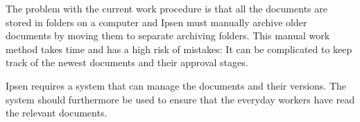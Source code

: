 The problem with the current work procedure is that all the documents are stored in folders on a computer and Ipsen must manually archive older documents by moving them to separate archiving folders.
This manual work method takes time and has a high risk of mistakes: 
It can be complicated to keep track of the newest documents and their approval stages. 

Ipsen requires a system that can manage the documents and their versions.
The system should furthermore be used to ensure that the everyday workers have read the relevant documents. 

